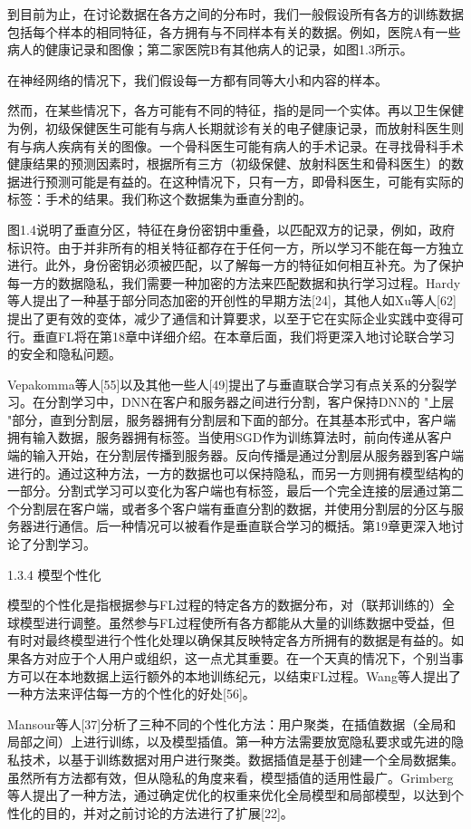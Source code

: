 到目前为止，在讨论数据在各方之间的分布时，我们一般假设所有各方的训练数据包括每个样本的相同特征，各方拥有与不同样本有关的数据。例如，医院A有一些病人的健康记录和图像；第二家医院B有其他病人的记录，如图1.3所示。

在神经网络的情况下，我们假设每一方都有同等大小和内容的样本。

然而，在某些情况下，各方可能有不同的特征，指的是同一个实体。再以卫生保健为例，初级保健医生可能有与病人长期就诊有关的电子健康记录，而放射科医生则有与病人疾病有关的图像。一个骨科医生可能有病人的手术记录。在寻找骨科手术健康结果的预测因素时，根据所有三方（初级保健、放射科医生和骨科医生）的数据进行预测可能是有益的。在这种情况下，只有一方，即骨科医生，可能有实际的标签：手术的结果。我们称这个数据集为垂直分割的。

图1.4说明了垂直分区，特征在身份密钥中重叠，以匹配双方的记录，例如，政府标识符。由于并非所有的相关特征都存在于任何一方，所以学习不能在每一方独立进行。此外，身份密钥必须被匹配，以了解每一方的特征如何相互补充。为了保护每一方的数据隐私，我们需要一种加密的方法来匹配数据和执行学习过程。Hardy等人提出了一种基于部分同态加密的开创性的早期方法[24]，其他人如Xu等人[62]提出了更有效的变体，减少了通信和计算要求，以至于它在实际企业实践中变得可行。垂直FL将在第18章中详细介绍。在本章后面，我们将更深入地讨论联合学习的安全和隐私问题。

Vepakomma等人[55]以及其他一些人[49]提出了与垂直联合学习有点关系的分裂学习。在分割学习中，DNN在客户和服务器之间进行分割，客户保持DNN的 "上层 "部分，直到分割层，服务器拥有分割层和下面的部分。在其基本形式中，客户端拥有输入数据，服务器拥有标签。当使用SGD作为训练算法时，前向传递从客户端的输入开始，在分割层传播到服务器。反向传播是通过分割层从服务器到客户端进行的。通过这种方法，一方的数据也可以保持隐私，而另一方则拥有模型结构的一部分。分割式学习可以变化为客户端也有标签，最后一个完全连接的层通过第二个分割层在客户端，或者多个客户端有垂直分割的数据，并使用分割层的分区与服务器进行通信。后一种情况可以被看作是垂直联合学习的概括。第19章更深入地讨论了分割学习。

1.3.4 模型个性化

模型的个性化是指根据参与FL过程的特定各方的数据分布，对（联邦训练的）全球模型进行调整。虽然参与FL过程使所有各方都能从大量的训练数据中受益，但有时对最终模型进行个性化处理以确保其反映特定各方所拥有的数据是有益的。如果各方对应于个人用户或组织，这一点尤其重要。在一个天真的情况下，个别当事方可以在本地数据上运行额外的本地训练纪元，以结束FL过程。Wang等人提出了一种方法来评估每一方的个性化的好处[56]。

Mansour等人[37]分析了三种不同的个性化方法：用户聚类，在插值数据（全局和局部之间）上进行训练，以及模型插值。第一种方法需要放宽隐私要求或先进的隐私技术，以基于训练数据对用户进行聚类。数据插值是基于创建一个全局数据集。虽然所有方法都有效，但从隐私的角度来看，模型插值的适用性最广。Grimberg等人提出了一种方法，通过确定优化的权重来优化全局模型和局部模型，以达到个性化的目的，并对之前讨论的方法进行了扩展[22]。

